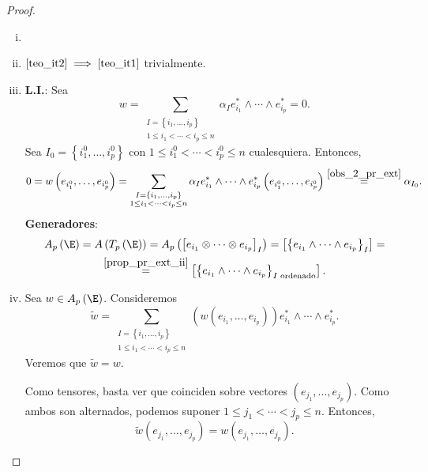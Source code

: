 \begin{proof}
    \begin{enumerate}[i)]
        \item[]
        \item
            $\ref{teo_it2} \implies \ref{teo_it1}$ trivialmente.
        \item
            \textbf{L.I.}: Sea
            \[
                w=\sum_{\substack{I=\left\{ i_1, \dots , i_p \right\} \\ 1\leq i_1 < \cdots < i_p \leq n}} \alpha _I e_{i_1}^* \wedge \cdots \wedge e_{i_p}^*=0.
            \]
            Sea $I_0=\left\{ i_1^0, \dots , i_p^0 \right\} $ con $1\leq i_1^0 < \cdots < i_p^0 \leq n$ cualesquiera. Entonces,
            \[
                0=w \left( e_{i_1^0} , \dots , e_{i_p^0} \right)= \sum_{\substack{I=\left\{ i_1, \dots , i_p \right\} \\ 1\leq i_1 < \cdots < i_p \leq n}} \alpha _I e_{i_1}^* \wedge \cdots \wedge e_{i_p}^* \left( e_{i_1^0} , \dots , e_{i_p^0} \right) \stackrel{\ref{obs_2_pr_ext}} = \alpha _ {I_0}.
            \]
            \textbf{Generadores}:
            \begin{gather*}
                A_p \left( \E \right) = A \left( T_p \left( \E \right) \right) = A_p \left( \left[ e_{i_1} \otimes \cdots \otimes e_{i_p} \right]_I \right) = \left[ \left\{ e_{i_1} \wedge \cdots \wedge e_{i_p} \right\}_I \right] = \\
                \stackrel{\ref{prop_pr_ext_ii}}= \left[ \left\{ e_{i_1} \wedge \cdots \wedge e_{i_p} \right\}_{I\text{ ordenado}} \right].
            \end{gather*}
        \item
            Sea $w \in A_p\left(\E\right)$. Consideremos
            \[
                \tilde{w}=\sum_{\substack{I=\left\{ i_1, \dots , i_p \right\} \\ 1\leq i_1 < \cdots < i_p \leq n}} \left( w \left( e_{i_1} , \dots , e_{i_p} \right) \right) e_{i_1}^* \wedge \cdots \wedge e_{i_p}^*.
            \]
            Veremos que $\tilde{w}=w$.
            
            Como tensores, basta ver que coinciden sobre vectores $\left( e_{j_1}, \dots , e_{j_p} \right)$. Como ambos son alternados, podemos suponer $1 \leq j_1  < \cdots < j_p \leq n$. Entonces,
            \[
                \tilde{w} \left( e_{j_1}, \dots , e_{j_p} \right) = w \left( e_{j_1}, \dots , e_{j_p} \right).
            \]

    \end{enumerate}
\end{proof}

